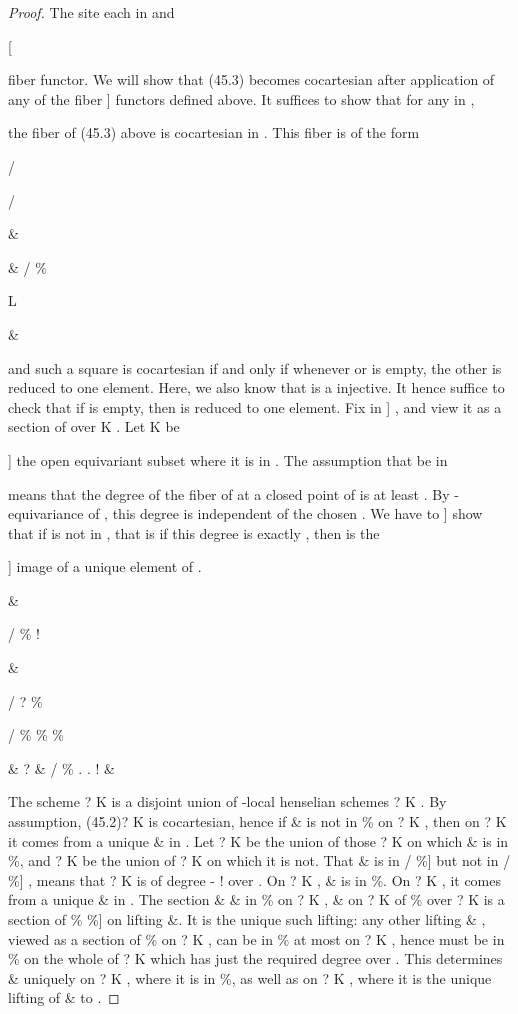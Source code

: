 \documentclass[11pt,a4paper]{article}
\theoremstyle{plain}
\theoremstyle{definition}
\begin{document}
\begin{proof} The site
each in
and

 [

fiber functor.
We will show that (45.3) becomes cocartesian after application of any of the fiber
]
functors 
defined above. It suffices to show that for any in
,

the fiber of (45.3)
above is cocartesian in
. This fiber is of the form

/

/ 
 

\&

\& / \%  

L

  


 \&

and such a square is cocartesian if and only if whenever or is empty, the other
is reduced to one element. Here, we also know that
 is a injective. It hence
suffice to check that if
is empty, then
is reduced to one element. Fix in
]
, and view it as a section of over
K . Let  K be

]
the open equivariant subset where it is in . The assumption that be in

means that the degree of the fiber  of
at a closed point of is at least
. By -equivariance of , this degree is independent of the chosen . We have to
]
show that if is not in
, that is if this degree is exactly , then is the
 
]
image of a unique element of
 .

\&

/ \%  
!

\&

/
?
\%
 



/ \%  
\%  \%



\&
 ? 
\&
/ \%
. 
.
!
\&



The scheme ? K  is a disjoint union of -local henselian schemes ? K
  . By assumption, (45.2)? K    is cocartesian, hence if \& is not in \% on
? K   , then on ? K   it comes from a unique \& in . Let ? K   be
the union of those ? K   on which \& is in \%, and ? K   be the union of
? K   on which it is not. That \& is in / \%] but not in / \%] , means that
? K   is of degree - ! over  . On ? K   , \& is in \%. On ? K  , it
comes from a unique \& in . The section
\& \& in \% on ? K   , \& on ? K   
of \%
over ? K  is a section of \%
 \%] on  lifting \&. It is the unique
such lifting: any other lifting \& , viewed as a section of \%
on ? K  , can be in
\% at most on ? K  , hence must be in \% on the whole of ? K   which has
just the required degree over  . This determines \& uniquely on ? K   , where
it is in \%, as well as on ? K   , where it is the unique lifting of \& to .


\end{proof}
\end{document}
